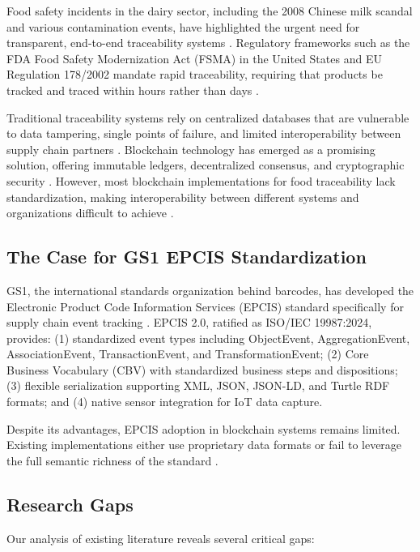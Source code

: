 \documentclass[preprint,review,12pt,authoryear]{elsarticle}
\begin{document}
Food safety incidents in the dairy sector, including the 2008 Chinese milk scandal and various contamination events, have highlighted the urgent need for transparent, end-to-end traceability systems \cite{qian2011food}. Regulatory frameworks such as the FDA Food Safety Modernization Act (FSMA) in the United States and EU Regulation 178/2002 mandate rapid traceability, requiring that products be tracked and traced within hours rather than days \cite{fsma2011,eu2002general}.

Traditional traceability systems rely on centralized databases that are vulnerable to data tampering, single points of failure, and limited interoperability between supply chain partners \cite{tian2016supply}. Blockchain technology has emerged as a promising solution, offering immutable ledgers, decentralized consensus, and cryptographic security \cite{zheng2018blockchain}. However, most blockchain implementations for food traceability lack standardization, making interoperability between different systems and organizations difficult to achieve \cite{salah2019blockchain}.

\subsection{The Case for GS1 EPCIS Standardization}

GS1, the international standards organization behind barcodes, has developed the Electronic Product Code Information Services (EPCIS) standard specifically for supply chain event tracking \cite{gs1epcis2021}. EPCIS 2.0, ratified as ISO/IEC 19987:2024, provides: (1) standardized event types including ObjectEvent, AggregationEvent, AssociationEvent, TransactionEvent, and TransformationEvent; (2) Core Business Vocabulary (CBV) with standardized business steps and dispositions; (3) flexible serialization supporting XML, JSON, JSON-LD, and Turtle RDF formats; and (4) native sensor integration for IoT data capture.

Despite its advantages, EPCIS adoption in blockchain systems remains limited. Existing implementations either use proprietary data formats or fail to leverage the full semantic richness of the standard \cite{caro2018agri}.

\subsection{Research Gaps}

Our analysis of existing literature reveals several critical gaps:
\end{document}
